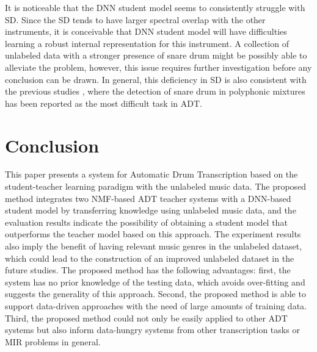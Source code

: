 \documentclass{article}
\begin{document}
It is noticeable that the DNN student model seems to consistently struggle with SD. Since the SD tends to have larger spectral overlap with the other instruments, it is conceivable that DNN student model will have difficulties learning a robust internal representation for this instrument. A collection of unlabeled data with a stronger presence of snare drum might be possibly able to alleviate the problem, however, this issue requires further investigation before any conclusion can be drawn. In general, this deficiency in SD is also consistent with the previous studies \cite{Paulus2009a, Wu2015a, Southall2016, Vogl2016}, where the detection of snare drum in polyphonic mixtures has been reported as the most difficult task in ADT. %

\section{Conclusion}\label{sec:conclusion}
This paper presents a system for Automatic Drum Transcription based on the student-teacher learning paradigm with the unlabeled music data. The proposed method integrates two NMF-based ADT teacher systems with a DNN-based student model by transferring knowledge using unlabeled music data, and the evaluation results indicate the possibility of obtaining a student model that outperforms the teacher model based on this approach. The experiment results also imply the benefit of having relevant music genres in the unlabeled dataset, which could lead to the construction of an improved unlabeled dataset in the future studies. The proposed method has the following advantages: first, the system has no prior knowledge of the testing data, which avoids over-fitting and suggests the generality of this approach. Second, the proposed method is able to support data-driven approaches with the need of large amounts of training data. Third, the proposed method could not only be easily applied to other ADT systems but also inform data-hungry systems from other transcription tasks or MIR problems in general.
\end{document}
